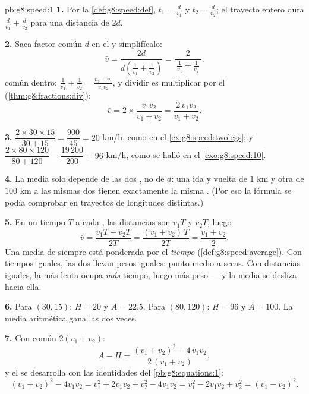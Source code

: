 \begin{solution}{pb:g8:speed:1}
\textbf{1.} Por la \cref{def:g8:speed:def}, $t_1 = \frac{d}{v_1}$ y
$t_2 = \frac{d}{v_2}$; el trayecto entero dura
$\frac{d}{v_1} + \frac{d}{v_2}$ para una distancia de $2d$.

\textbf{2.} Saca factor común $d$ en el  y simplifícalo:
\[
\bar v
= \frac{2d}{d\left(\frac{1}{v_1} + \frac{1}{v_2}\right)}
= \frac{2}{\ \frac{1}{v_1} + \frac{1}{v_2}\ } .
\]
 común dentro:
$\frac{1}{v_1} + \frac{1}{v_2} = \frac{v_2 + v_1}{v_1 v_2}$, y
dividir es multiplicar por el 
(\cref{thm:g8:fractions:div}):
\[
\bar v = 2 \times \frac{v_1 v_2}{v_1 + v_2}
= \frac{2\, v_1 v_2}{v_1 + v_2} .
\]

\textbf{3.} $\dfrac{2 \times 30 \times 15}{30 + 15}
= \dfrac{900}{45} = 20$ km/h, como en el
\cref{ex:g8:speed:twolegs}; y
$\dfrac{2 \times 80 \times 120}{80 + 120} = \dfrac{19\,200}{200}
= 96$ km/h, como se halló en el \cref{exo:g8:speed:10}.

\textbf{4.} La media solo depende de las dos , no de
$d$: una ida y vuelta de $1$ km y otra de $100$ km a las mismas
dos  tienen exactamente la misma . (Por eso la
fórmula se podía comprobar en trayectos de longitudes distintas.)

\textbf{5.} En un tiempo $T$ a cada , las distancias son $v_1 T$
y $v_2 T$, luego
\[
\bar v = \frac{v_1 T + v_2 T}{2T}
= \frac{(v_1 + v_2)\,T}{2T}
= \frac{v_1 + v_2}{2} .
\]
Una media de  siempre está ponderada por el \emph{tiempo}
(\cref{def:g8:speed:average}). Con tiempos iguales, las dos 
llevan pesos iguales: punto medio a secas. Con distancias iguales, la
 más lenta ocupa \emph{más} tiempo, luego más peso ---
y la media se desliza hacia ella.

\textbf{6.} Para $(30, 15)$: $H = 20$ y $A = 22.5$. Para
$(80, 120)$: $H = 96$ y $A = 100$. La media aritmética gana
las dos veces.

\textbf{7.} Con  común $2(v_1 + v_2)$:
\[
A - H
= \frac{(v_1 + v_2)^2 - 4\, v_1 v_2}{2\,(v_1 + v_2)} ,
\]
y el  se desarrolla con las identidades del
\cref{pb:g8:equations:1}:
\[
(v_1 + v_2)^2 - 4 v_1 v_2
= v_1^2 + 2 v_1 v_2 + v_2^2 - 4 v_1 v_2
= v_1^2 - 2 v_1 v_2 + v_2^2
= (v_1 - v_2)^2 .
\]


\end{solution}
